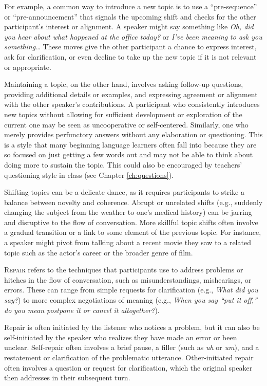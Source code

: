 For example, a common way to introduce a new topic is to use a ``pre-sequence'' or ``pre-announcement'' that signals the upcoming shift and checks for the other participant's interest or alignment. A speaker might say something like \textit{Oh, did you hear about what happened at the office today?} or \textit{I've been meaning to ask you something\dots} These moves give the other participant a chance to express interest, ask for clarification, or even decline to take up the new topic if it is not relevant or appropriate.

Maintaining a topic, on the other hand, involves asking follow-up questions, providing additional details or examples, and expressing agreement or alignment with the other speaker's contributions. A participant who consistently introduces new topics without allowing for sufficient development or exploration of the current one may be seen as uncooperative or self-centered. Similarly, one who merely provides perfunctory answers without any elaboration or questioning. This is a style that many beginning language learners often fall into because they are so focused on just getting a few words out and may not be able to think about doing more to sustain the topic. This could also be encouraged by teachers' questioning style in class (see Chapter \ref{ch:questions}).

Shifting topics can be a delicate dance, as it requires participants to strike a balance between novelty and coherence. Abrupt or unrelated shifts (e.g., suddenly changing the subject from the weather to one's medical history) can be jarring and disruptive to the flow of conversation. More skillful topic shifts often involve a gradual transition or a link to some element of the previous topic. For instance, a speaker might pivot from talking about a recent movie they saw to a related topic such as the actor's career or the broader genre of film.

\textsc{Repair} refers to the techniques that participants use to address problems or hitches in the flow of conversation, such as misunderstandings, mishearings, or errors. These can range from simple requests for clarification (e.g., \textit{What did you say?}) to more complex negotiations of meaning (e.g., \textit{When you say ``put it off,'' do you mean postpone it or cancel it altogether?}).

Repair is often initiated by the listener who notices a problem, but it can also be self-initiated by the speaker who realizes they have made an error or been unclear. Self-repair often involves a brief pause, a filler (such as \textit{uh} or \textit{um}), and a restatement or clarification of the problematic utterance. Other-initiated repair often involves a question or request for clarification, which the original speaker then addresses in their subsequent turn.

